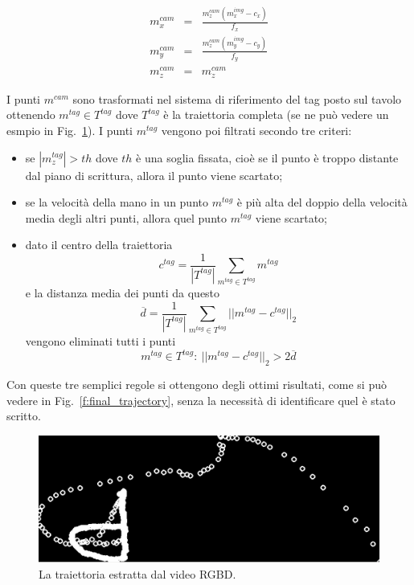 \documentclass[10pt,twocolumn]{article}
\newcommand{\Fig}[1]{Fig.~\ref{#1}}
\begin{document}
  \begin{eqnarray}
    m_x^{cam} & = & \frac{m_z^{cam} (m_x^{img} - c_x)}{f_x} \\
    m_y^{cam} & = & \frac{m_z^{cam} (m_y^{img} - c_y)}{f_y} \\
    m_z^{cam} & = & m_z^{cam}
  \end{eqnarray}

  I punti $m^{cam}$ sono trasformati nel sistema di riferimento del tag posto
  sul tavolo ottenendo $m^{tag} \in T^{tag}$ dove $T^{tag}$ è la traiettoria
  completa (se ne può vedere un esmpio in \Fig{f:trajectory}). I punti $m^{tag}$
  vengono poi filtrati secondo tre criteri:
  \begin{itemize}
    \item se $|m_z^{tag}| > th$ dove $th$ è una soglia fissata, cioè se il punto è
    troppo distante dal piano di scrittura, allora il punto viene scartato;
    \item se la velocità della mano in un punto $m^{tag}$ è più alta del doppio della
    velocità media degli altri punti, allora quel punto $m^{tag}$ viene scartato;
    \item dato il centro della traiettoria 
      $$c^{tag} = \frac{1}{|T^{tag}|} \sum_{m^{tag} \in T^{tag}} m^{tag}$$ 
      e la distanza media dei punti da questo 
      $$\overline{d} = \frac{1}{|T^{tag}|} \sum_{m^{tag} \in T^{tag}}||m^{tag}-c^{tag}||_2$$
      vengono eliminati tutti i punti
      $$m^{tag} \in T^{tag} \colon\ ||m^{tag} - c^{tag}||_2 >  2\overline{d}$$
  \end{itemize}

  Con queste tre semplici regole si ottengono degli ottimi risultati, come si
  può vedere in \Fig{f:final_trajectory}, senza la necessità di identificare
  quel è stato scritto.

  \begin{figure}[h]
    \centering
    \includegraphics[width=\linewidth]{immagini/trajectory.png}
    \caption{La traiettoria estratta dal video RGBD.}
    \label{f:trajectory}
  \end{figure}
\end{document}
